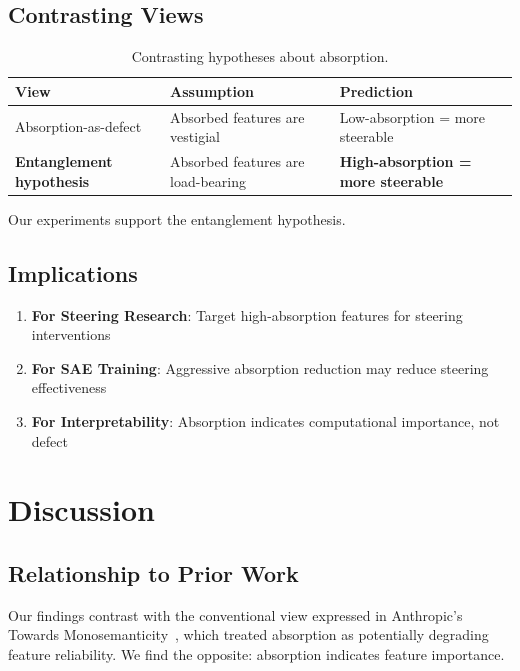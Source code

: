 \documentclass{article}
\begin{document}
\subsection{Contrasting Views}

\begin{table}[h]
\caption{Contrasting hypotheses about absorption.}
\label{tab:contrasting-views}
\centering
\begin{tabular}{lll}
\toprule
View & Assumption & Prediction \\
\midrule
Absorption-as-defect & Absorbed features are vestigial & Low-absorption = more steerable \\
\textbf{Entanglement hypothesis} & Absorbed features are load-bearing & \textbf{High-absorption = more steerable} \\
\bottomrule
\end{tabular}
\end{table}

Our experiments support the entanglement hypothesis.

\subsection{Implications}

\begin{enumerate}
    \item \textbf{For Steering Research}: Target high-absorption features for steering interventions
    \item \textbf{For SAE Training}: Aggressive absorption reduction may reduce steering effectiveness
    \item \textbf{For Interpretability}: Absorption indicates computational importance, not defect
\end{enumerate}


\section{Discussion}

\subsection{Relationship to Prior Work}

Our findings contrast with the conventional view expressed in Anthropic's Towards Monosemanticity~\citep{anthropic2023towards}, which treated absorption as potentially degrading feature reliability. We find the opposite: absorption indicates feature importance.
\end{document}
